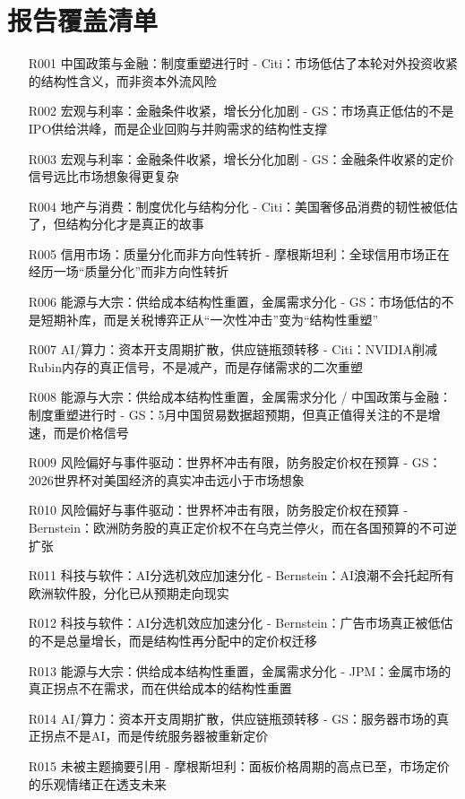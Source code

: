 \documentclass[11pt]{ctexart}
\begin{document}
\section{报告覆盖清单}
\begin{itemize}
  \item [R001] 中国政策与金融：制度重塑进行时 - Citi：市场低估了本轮对外投资收紧的结构性含义，而非资本外流风险
  \item [R002] 宏观与利率：金融条件收紧，增长分化加剧 - GS：市场真正低估的不是IPO供给洪峰，而是企业回购与并购需求的结构性支撑
  \item [R003] 宏观与利率：金融条件收紧，增长分化加剧 - GS：金融条件收紧的定价信号远比市场想象得更复杂
  \item [R004] 地产与消费：制度优化与结构分化 - Citi：美国奢侈品消费的韧性被低估了，但结构分化才是真正的故事
  \item [R005] 信用市场：质量分化而非方向性转折 - 摩根斯坦利：全球信用市场正在经历一场“质量分化”而非方向性转折
  \item [R006] 能源与大宗：供给成本结构性重置，金属需求分化 - GS：市场低估的不是短期补库，而是关税博弈正从“一次性冲击”变为“结构性重塑”
  \item [R007] AI/算力：资本开支周期扩散，供应链瓶颈转移 - Citi：NVIDIA削减Rubin内存的真正信号，不是减产，而是存储需求的二次重塑
  \item [R008] 能源与大宗：供给成本结构性重置，金属需求分化 / 中国政策与金融：制度重塑进行时 - GS：5月中国贸易数据超预期，但真正值得关注的不是增速，而是价格信号
  \item [R009] 风险偏好与事件驱动：世界杯冲击有限，防务股定价权在预算 - GS：2026世界杯对美国经济的真实冲击远小于市场想象
  \item [R010] 风险偏好与事件驱动：世界杯冲击有限，防务股定价权在预算 - Bernstein：欧洲防务股的真正定价权不在乌克兰停火，而在各国预算的不可逆扩张
  \item [R011] 科技与软件：AI分选机效应加速分化 - Bernstein：AI浪潮不会托起所有欧洲软件股，分化已从预期走向现实
  \item [R012] 科技与软件：AI分选机效应加速分化 - Bernstein：广告市场真正被低估的不是总量增长，而是结构性再分配中的定价权迁移
  \item [R013] 能源与大宗：供给成本结构性重置，金属需求分化 - JPM：金属市场的真正拐点不在需求，而在供给成本的结构性重置
  \item [R014] AI/算力：资本开支周期扩散，供应链瓶颈转移 - GS：服务器市场的真正拐点不是AI，而是传统服务器被重新定价
  \item [R015] 未被主题摘要引用 - 摩根斯坦利：面板价格周期的高点已至，市场定价的乐观情绪正在透支未来

\end{itemize}
\end{document}
